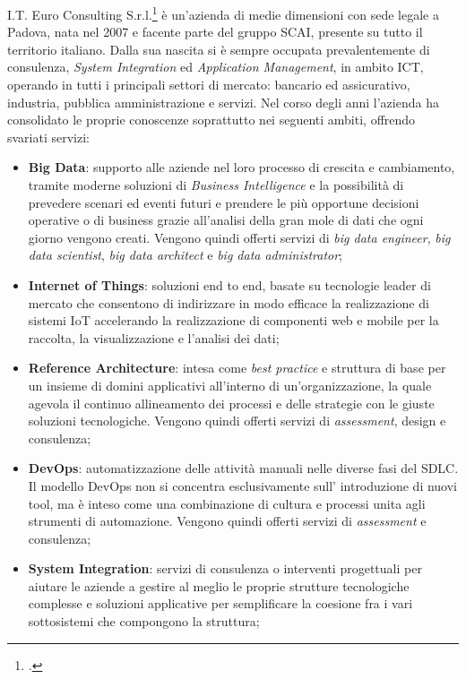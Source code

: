 I.T. Euro Consulting S.r.l.\footcite{https://www.itecons.it} è un'azienda di medie dimensioni con sede legale a Padova, nata nel 2007 e facente parte del gruppo SCAI, presente su tutto il territorio italiano. 
Dalla sua nascita si è sempre occupata prevalentemente di consulenza, \textit{System Integration} ed \textit{Application Management}, in ambito ICT, operando in tutti i principali settori di mercato: bancario ed assicurativo, industria, pubblica amministrazione e servizi.
Nel corso degli anni l'azienda ha consolidato le proprie conoscenze soprattutto nei seguenti ambiti, offrendo svariati servizi:
\begin{itemize}
	\item \textbf{Big Data}: supporto alle aziende nel loro processo di crescita e cambiamento, tramite moderne soluzioni di \textit{Business Intelligence} e la possibilità di prevedere scenari ed eventi futuri e prendere le più opportune decisioni operative o di business grazie all'analisi della gran mole di dati che ogni giorno vengono creati. Vengono quindi offerti servizi di \textit{big data engineer}, \textit{big data scientist}, \textit{big data architect} e \textit{big data administrator};
	\item \textbf{Internet of Things}: soluzioni end to end, basate su tecnologie leader di mercato che consentono di indirizzare in modo efficace la realizzazione di sistemi IoT accelerando la realizzazione di componenti web e mobile per la raccolta, la visualizzazione e l’analisi dei dati;
	\item \textbf{Reference Architecture}: intesa come \textit{best practice} e struttura di base per un insieme di domini applicativi all’interno di un’organizzazione, la quale agevola il continuo allineamento dei processi e delle strategie con le giuste soluzioni tecnologiche. Vengono quindi offerti servizi di \textit{assessment}, design e consulenza;
	\item \textbf{DevOps}: automatizzazione delle attività manuali nelle diverse fasi del \gls{SDLC}. Il modello DevOps non si concentra esclusivamente sull’ introduzione di nuovi tool, ma è inteso come una combinazione di cultura e processi unita agli strumenti di automazione. Vengono quindi offerti servizi di \textit{assessment} e consulenza; 
	\item \textbf{System Integration}: servizi di consulenza o interventi progettuali per aiutare le aziende a gestire al meglio le proprie strutture tecnologiche complesse e soluzioni applicative per semplificare la coesione fra i vari sottosistemi che compongono la struttura;

\end{itemize}

